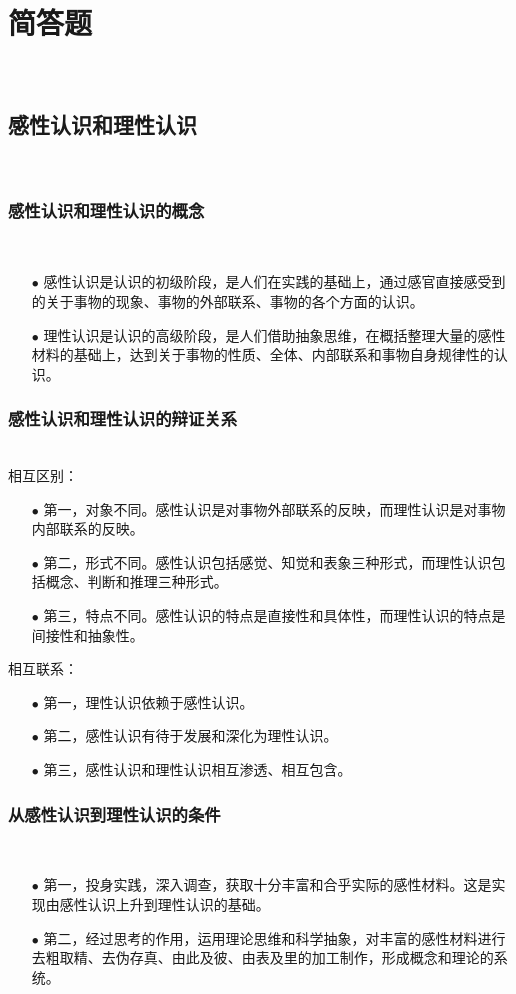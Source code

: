 \documentclass{ctexart}
\begin{document}
\section{简答题}~{}
\subsection{感性认识和理性认识}~{}
\vspace{-5mm}
\subsubsection{感性认识和理性认识的概念}~{}
\vspace{-5mm}
\begin{itemize}
\item[$\bullet$]感性认识是认识的初级阶段，是人们在实践的基础上，通过感官直接感受到的关于事物的现象、事物的外部联系、事物的各个方面的认识。
\item[$\bullet$]理性认识是认识的高级阶段，是人们借助抽象思维，在概括整理大量的感性材料的基础上，达到关于事物的性质、全体、内部联系和事物自身规律性的认识。 
    
\end{itemize}

\subsubsection{感性认识和理性认识的辩证关系}~{}
\vspace{-5mm}
\\
相互区别：
\begin{itemize}
\item[$\bullet$]第一，对象不同。感性认识是对事物外部联系的反映，而理性认识是对事物内部联系的反映。
\item[$\bullet$]第二，形式不同。感性认识包括感觉、知觉和表象三种形式，而理性认识包括概念、判断和推理三种形式。
\item[$\bullet$]第三，特点不同。感性认识的特点是直接性和具体性，而理性认识的特点是间接性和抽象性。    
\end{itemize}
相互联系：
\begin{itemize}
    \item[$\bullet$]第一，理性认识依赖于感性认识。
    \item[$\bullet$]第二，感性认识有待于发展和深化为理性认识。
    \item[$\bullet$]第三，感性认识和理性认识相互渗透、相互包含。
    \end{itemize}

\subsubsection{从感性认识到理性认识的条件}~{}
\vspace{-5mm}
\begin{itemize}
\item[$\bullet$]第一，投身实践，深入调查，获取十分丰富和合乎实际的感性材料。这是实现由感性认识上升到理性认识的基础。
\item[$\bullet$]第二，经过思考的作用，运用理论思维和科学抽象，对丰富的感性材料进行去粗取精、去伪存真、由此及彼、由表及里的加工制作，形成概念和理论的系统。
\end{itemize}
\end{document}
